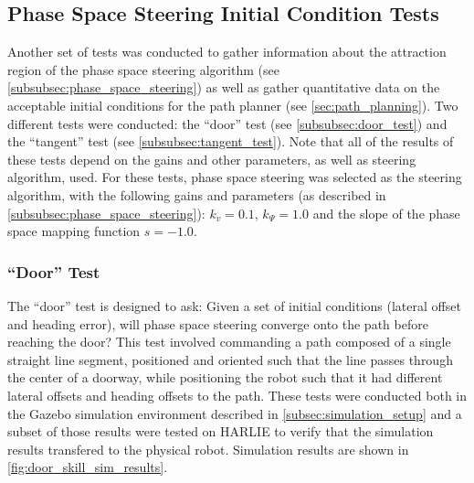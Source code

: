 \subsection{Phase Space Steering Initial Condition Tests}\label{subsec:phase_space_steering_skills}

Another set of tests was conducted to gather information about the attraction region of the phase space steering algorithm (see \autoref{subsubsec:phase_space_steering}) as well as gather quantitative data on the acceptable initial conditions for the path planner (see \autoref{sec:path_planning}). Two different tests were conducted: the ``door'' test (see \autoref{subsubsec:door_test}) and the ``tangent'' test (see \autoref{subsubsec:tangent_test}). Note that all of the results of these tests depend on the gains and other parameters, as well as steering algorithm, used. For these tests, phase space steering was selected as the steering algorithm, with the following gains and parameters (as described in \autoref{subsubsec:phase_space_steering}): $k_v = 0.1$, $k_\Psi = 1.0$ and the slope of the phase space mapping function $s = -1.0$.

\subsubsection{``Door'' Test}\label{subsubsec:door_test}

The ``door'' test is designed to ask: Given a set of initial conditions (lateral offset and heading error), will phase space steering converge onto the path before reaching the door? This test involved commanding a path composed of a single straight line segment, positioned and oriented such that the line passes through the center of a doorway, while positioning the robot such that it had different lateral offsets and heading offsets to the path. These tests were conducted both in the Gazebo simulation environment described in \autoref{subsec:simulation_setup} and a subset of those results were tested on HARLIE to verify that the simulation results transfered to the physical robot. Simulation results are shown in \autoref{fig:door_skill_sim_results}.

